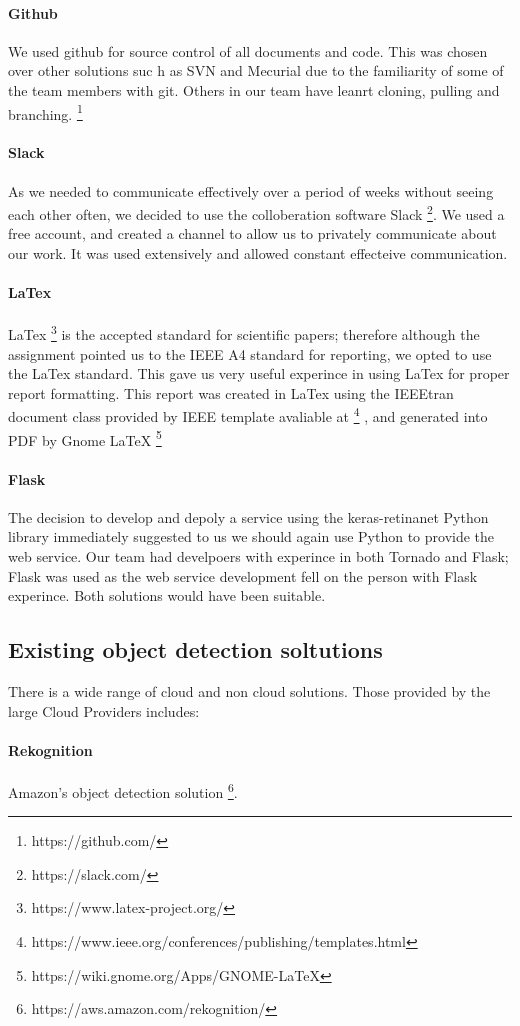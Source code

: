 \documentclass[conference]{IEEEtran}
\begin{document}
\paragraph{Github}
We used github for source control of all documents and code. This was chosen over other solutions suc h as SVN and Mecurial due to the familiarity of some of the team members with git. Others in our team have leanrt cloning, pulling and branching. \footnote{https://github.com/}
\paragraph{Slack}
As we needed to communicate effectively over a period of weeks without seeing each other often, we decided to use the colloberation software Slack \footnote{https://slack.com/}. We used a free account, and created a channel to allow us to privately communicate about our work. It was used extensively and allowed constant effecteive communication.
\paragraph{LaTex}
LaTex \footnote{https://www.latex-project.org/} is the accepted standard for scientific papers; therefore although the assignment pointed us to the IEEE A4 standard for reporting, we opted to use the LaTex standard. This gave us very useful experince in using LaTex for proper report formatting.
This report was created in LaTex using the IEEEtran document class provided by IEEE template avaliable at
\footnote{https://www.ieee.org/conferences/publishing/templates.html}
, and generated into PDF by Gnome LaTeX
\footnote{https://wiki.gnome.org/Apps/GNOME-LaTeX}
\paragraph{Flask}
The decision to develop and depoly a service using the keras-retinanet Python library immediately suggested to us we should again use Python to provide the web service. Our team had develpoers with experince in both Tornado and Flask; Flask was used as the web service development fell on the person with Flask experince. Both solutions would have been suitable.
\subsection{Existing object detection soltutions}
There is a wide range of cloud and non cloud solutions. Those provided by the large Cloud Providers includes:
\paragraph{Rekognition}
Amazon's object detection solution \footnote{https://aws.amazon.com/rekognition/}.
\end{document}
